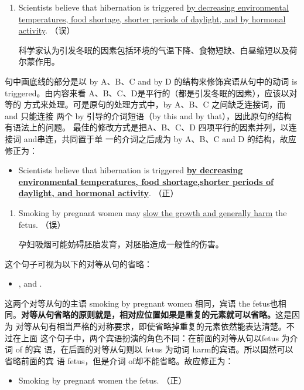 \begin{enumerate}[resume]
\item Scientists believe that hibernation is triggered \uline{by decreasing
  environmental temperatures, food shortage, shorter periods of daylight,
  and by hormonal activity}. （误）

  科学家认为引发冬眠的因素包括环境的气温下降、食物短缺、白昼缩短以及荷尔蒙作用。
\end{enumerate}

句中画底线的部分是以 by A、B、C and by D 的结构来修饰宾语从句中的动词 is
triggered。由内容来看 A、B、C、D是平行的（都是引发冬眠的因素），应该以对等的
方式来处理。可是原句的处理方式中，by A、B、C 之间缺乏连接词，而 and 只能连接
两个 by 引导的介词短语（by this and by that），因此原句的结构有语法上的问题。
最佳的修改方式是把A、B、C、D 四项平行的因素并列，以连接词 and串连，共同置于单
一的介词之后成为 by A、B、C and D 的结构，故应修正为：
\begin{mybox}

\begin{itemize}
\item Scientists believe that hibernation is triggered \ul{\textbf{by decreasing
    environmental temperatures, food shortage,shorter periods of daylight,
    and hormonal activity}}. （正）
\end{itemize}
\end{mybox}

\begin{enumerate}[resume]
\item Smoking by pregnant women may \ul{slow the growth and generally harm} the
  fetus. （误）

  孕妇吸烟可能妨碍胚胎发育，对胚胎造成一般性的伤害。
\end{enumerate}
这个句子可视为以下的对等从句的省略：
\begin{itemize}
\item {}  , and  .
\end{itemize}

这两个对等从句的主语 smoking by pregnant women 相同，宾语 the fetus也相
同。\textbf{对等从句省略的原则就是，相对应位置如果是重复的元素就可以省略。}这是因为
对等从句有相当严格的对称要求，即使省略掉重复的元素依然能表达清楚。不过在上面
这个句子中，两个宾语扮演的角色不同：在前面的对等从句以fetus 为介词 of 的宾
语，在后面的对等从句则以 fetus 为动词 harm的宾语。所以固然可以省略前面的宾
语 fetus，但是介词 of却不能省略。故应修正为：
\begin{mybox}

\begin{itemize}
\item Smoking by pregnant women  the
  fetus. （正）
\end{itemize}
\end{mybox}


